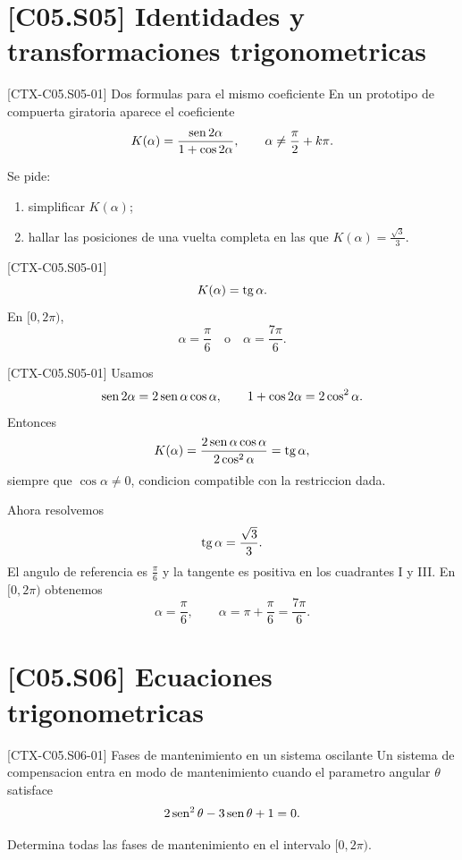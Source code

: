 \section{[C05.S05] Identidades y transformaciones trigonometricas}

\begin{exercise}{[CTX-C05.S05-01] Dos formulas para el mismo coeficiente}
En un prototipo de compuerta giratoria aparece el coeficiente
\[
K(\alpha)=\frac{\operatorname{sen} 2\alpha}{1+\cos 2\alpha},
\qquad
\alpha\neq \frac{\pi}{2}+k\pi.
\]

Se pide:
\begin{enumerate}
  \item simplificar \(K(\alpha)\);
  \item hallar las posiciones de una vuelta completa en las que \(K(\alpha)=\frac{\sqrt{3}}{3}\).
\end{enumerate}
\end{exercise}

\begin{shortanswer}{[CTX-C05.S05-01]}
\[
K(\alpha)=\operatorname{tg}\alpha.
\]
En \([0,2\pi)\),
\[
\alpha=\frac{\pi}{6}\quad \text{o}\quad \alpha=\frac{7\pi}{6}.
\]
\end{shortanswer}

\begin{fullsolution}{[CTX-C05.S05-01]}
Usamos
\[
\operatorname{sen} 2\alpha=2\operatorname{sen}\alpha\cos\alpha,
\qquad
1+\cos 2\alpha=2\cos^2\alpha.
\]
Entonces
\[
K(\alpha)=\frac{2\operatorname{sen}\alpha\cos\alpha}{2\cos^2\alpha}=\operatorname{tg}\alpha,
\]
siempre que \(\cos\alpha\neq 0\), condicion compatible con la restriccion dada.

Ahora resolvemos
\[
\operatorname{tg}\alpha=\frac{\sqrt{3}}{3}.
\]
El angulo de referencia es \(\frac{\pi}{6}\) y la tangente es positiva en los cuadrantes I y
III. En \([0,2\pi)\) obtenemos
\[
\alpha=\frac{\pi}{6},\qquad \alpha=\pi+\frac{\pi}{6}=\frac{7\pi}{6}.
\]
\end{fullsolution}

\section{[C05.S06] Ecuaciones trigonometricas}

\begin{exercise}{[CTX-C05.S06-01] Fases de mantenimiento en un sistema oscilante}
Un sistema de compensacion entra en modo de mantenimiento cuando el parametro angular
\(\theta\) satisface
\[
2\operatorname{sen}^2\theta-3\operatorname{sen}\theta+1=0.
\]

Determina todas las fases de mantenimiento en el intervalo \([0,2\pi)\).
\end{exercise}

